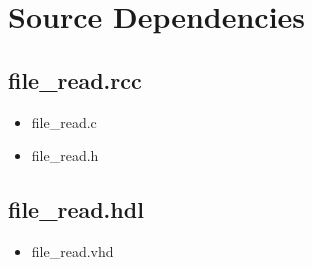 \documentclass{article}
\def\comp{file\_read}
\begin{document}
\section*{Source Dependencies}
\subsection*{\comp.rcc}
\begin{itemize}
\item file\_read.c
\item file\_read.h 
\end{itemize}
\subsection*{\comp.hdl}
\begin{itemize}
\item file\_read.vhd
\end{itemize}
\end{document}
